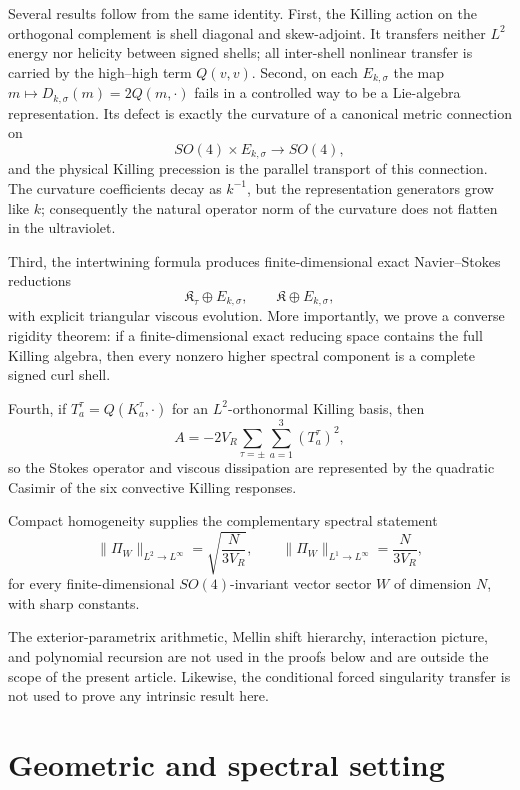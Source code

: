 \documentclass[
 aps,
 prd,
 reprint,
 amsmath,
 amssymb,
 nofootinbib,
 superscriptaddress
]{revtex4-2}
\theoremstyle{definition}
\theoremstyle{remark}
\begin{document}
Several results follow from the same identity. First, the Killing action on
the orthogonal complement is shell diagonal and skew-adjoint. It transfers
neither $L^2$ energy nor helicity between signed shells; all inter-shell
nonlinear transfer is carried by the high--high term $Q(v,v)$. Second, on
each $E_{k,\sigma}$ the map $m\mapsto D_{k,\sigma}(m)=2Q(m,\cdot)$ fails in a
controlled way to be a Lie-algebra representation. Its defect is exactly the
curvature of a canonical metric connection on
\[
 SO(4)\times E_{k,\sigma}\longrightarrow SO(4),
\]
and the physical Killing precession is the parallel transport of this
connection. The curvature coefficients decay as $k^{-1}$, but the
representation generators grow like $k$; consequently the natural operator
norm of the curvature does not flatten in the ultraviolet.

Third, the intertwining formula produces finite-dimensional exact
Navier--Stokes reductions
\[
 \mathfrak K_\tau\oplus E_{k,\sigma},
 \qquad
 \mathfrak K\oplus E_{k,\sigma},
\]
with explicit triangular viscous evolution. More importantly, we prove a
converse rigidity theorem: if a finite-dimensional exact reducing space
contains the full Killing algebra, then every nonzero higher spectral
component is a complete signed curl shell.

Fourth, if $T_a^\tau=Q(K_a^\tau,\cdot)$ for an $L^2$-orthonormal Killing
basis, then
\begin{equation}
 \boxed{
 A=-2V_R\sum_{\tau=\pm}\sum_{a=1}^3(T_a^\tau)^2,
 }
 \label{eq:intro-casimir}
\end{equation}
so the Stokes operator and viscous dissipation are represented by the
quadratic Casimir of the six convective Killing responses.

Compact homogeneity supplies the complementary spectral statement
\begin{equation}
 \|\Pi_W\|_{L^2\to L^\infty}
 =
 \sqrt{\frac{N}{3V_R}},
 \qquad
 \|\Pi_W\|_{L^1\to L^\infty}
 =
 \frac{N}{3V_R},
 \label{eq:intro-projectors}
\end{equation}
for every finite-dimensional $SO(4)$-invariant vector sector $W$ of dimension
$N$, with sharp constants.

The exterior-parametrix arithmetic, Mellin shift hierarchy, interaction
picture, and polynomial recursion are not used in the proofs below and are
outside the scope of the present article. Likewise, the conditional forced
singularity transfer is not used to prove any intrinsic result here.


\section{Geometric and spectral setting}
\label{sec:setting}
\end{document}
